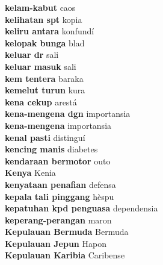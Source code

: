 \textbf{ kelam-kabut  } caos \\
\textbf{ kelihatan spt  } kopia \\
\textbf{ keliru antara  } konfundí \\
\textbf{ kelopak bunga  } blad \\
\textbf{ keluar dr  } sali \\
\textbf{ keluar masuk  } sali \\
\textbf{ kem tentera  } baraka \\
\textbf{ kemelut turun  } kura \\
\textbf{ kena cekup  } arestá \\
\textbf{ kena-mengena dgn  } importansia \\
\textbf{ kena-mengena  } importansia \\
\textbf{ kenal pasti  } distinguí \\
\textbf{ kencing manis  } diabetes \\
\textbf{ kendaraan bermotor  } outo \\
\textbf{ Kenya  } Kenia \\
\textbf{ kenyataan penafian  } defensa \\
\textbf{ kepala tali pinggang  } hèspu \\
\textbf{ kepatuhan kpd penguasa  } dependensia \\
\textbf{ keperang-perangan  } maron \\
\textbf{ Kepulauan Bermuda  } Bermuda \\
\textbf{ Kepulauan Jepun  } Hapon \\
\textbf{ Kepulauan Karibia  } Caribense \\
